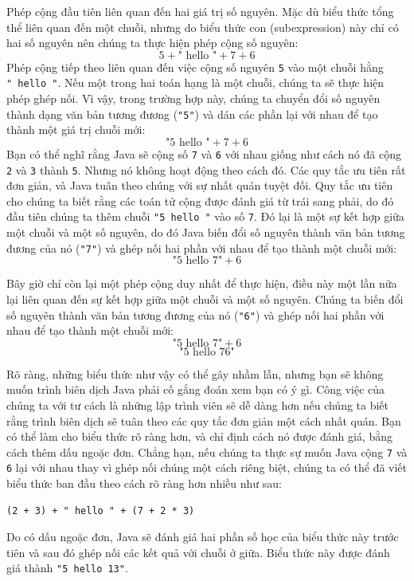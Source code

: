 Phép cộng đầu tiên liên quan đến hai giá trị số nguyên. Mặc dù biểu thức
tổng thể liên quan đến một chuỗi, nhưng do biểu thức con (subexpression)
này chỉ có hai số nguyên nên chúng ta thực hiện phép cộng số nguyên:
\[ 5 + \text{" hello "} + 7 + 6 \] Phép cộng tiếp theo liên quan đến
việc cộng số nguyên \texttt{5} vào một chuỗi hằng \texttt{"\ hello\ "}.
Nếu một trong hai toán hạng là một chuỗi, chúng ta sẽ thực hiện phép
ghép nối. Vì vậy, trong trường hợp này, chúng ta chuyển đổi số nguyên
thành dạng văn bản tương đương (\texttt{"5"}) và dán các phần lại với
nhau để tạo thành một giá trị chuỗi mới: \[ \text{"5 hello "} + 7 + 6 \]
Bạn có thể nghĩ rằng Java sẽ cộng số \texttt{7} và \texttt{6} với nhau
giống như cách nó đã cộng \texttt{2} và \texttt{3} thành \texttt{5}.
Nhưng nó không hoạt động theo cách đó. Các quy tắc ưu tiên rất đơn giản,
và Java tuân theo chúng với sự nhất quán tuyệt đối. Quy tắc ưu tiên cho
chúng ta biết rằng các toán tử cộng được đánh giá từ trái sang phải, do
đó đầu tiên chúng ta thêm chuỗi \texttt{"5\ hello\ "} vào số \texttt{7}.
Đó lại là một sự kết hợp giữa một chuỗi và một số nguyên, do đó Java
biến đổi số nguyên thành văn bản tương đương của nó (\texttt{"7"}) và
ghép nối hai phần với nhau để tạo thành một chuỗi mới:
\[ \text{"5 hello 7"} + 6 \]

Bây giờ chỉ còn lại một phép cộng duy nhất để thực hiện, điều này một
lần nữa lại liên quan đến sự kết hợp giữa một chuỗi và một số nguyên.
Chúng ta biến đổi số nguyên thành văn bản tương đương của nó
(\texttt{"6"}) và ghép nối hai phần với nhau để tạo thành một chuỗi mới:
\[ \text{"5 hello 7"} + 6 \] \[ \text{"5 hello 76"} \]

Rõ ràng, những biểu thức như vậy có thể gây nhầm lẫn, nhưng bạn sẽ không
muốn trình biên dịch Java phải cố gắng đoán xem bạn có ý gì. Công việc
của chúng ta với tư cách là những lập trình viên sẽ dễ dàng hơn nếu
chúng ta biết rằng trình biên dịch sẽ tuân theo các quy tắc đơn giản một
cách nhất quán. Bạn có thể làm cho biểu thức rõ ràng hơn, và chỉ định
cách nó được đánh giá, bằng cách thêm dấu ngoặc đơn. Chẳng hạn, nếu
chúng ta thực sự muốn Java cộng \texttt{7} và \texttt{6} lại với nhau
thay vì ghép nối chúng một cách riêng biệt, chúng ta có thể đã viết biểu
thức ban đầu theo cách rõ ràng hơn nhiều như sau:

\begin{verbatim}
(2 + 3) + " hello " + (7 + 2 * 3)
\end{verbatim}

Do có dấu ngoặc đơn, Java sẽ đánh giá hai phần số học của biểu thức này
trước tiên và sau đó ghép nối các kết quả với chuỗi ở giữa. Biểu thức
này được đánh giá thành \texttt{"5\ hello\ 13"}.


